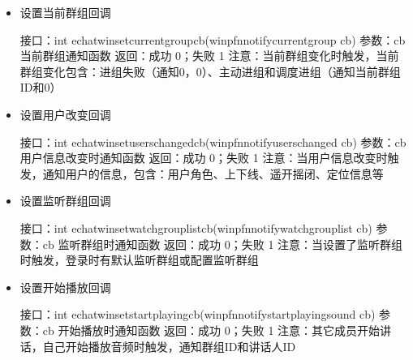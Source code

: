 \documentclass[letterpaper,10pt,english]{sphinxmanual}
\begin{document}
\begin{itemize}
%
\begin{sphinxVerbatim}[commandchars=\\\{\}]
接口：int echat\PYGZus{}win\PYGZus{}set\PYGZus{}stop\PYGZus{}speak\PYGZus{}cb(win\PYGZus{}pfn\PYGZus{}notify\PYGZus{}stop\PYGZus{}speak cb)
参数：cb 停止讲话时通知函数
返回：成功 0；失败 \PYGZhy{}1
注意：自己结束讲话时触发，结束讲话包含：主动结束（通知0，0）、被摘MIC和获取MIC失败（通知群组ID和当前用户ID）等
\end{sphinxVerbatim}

\item {} 
设置当前群组回调

%
\begin{sphinxVerbatim}[commandchars=\\\{\}]
接口：int echat\PYGZus{}win\PYGZus{}set\PYGZus{}current\PYGZus{}group\PYGZus{}cb(win\PYGZus{}pfn\PYGZus{}notify\PYGZus{}current\PYGZus{}group cb)
参数：cb 当前群组通知函数
返回：成功 0；失败 \PYGZhy{}1
注意：当前群组变化时触发，当前群组变化包含：进组失败（通知0，0）、主动进组和调度进组（通知当前群组ID和0）
\end{sphinxVerbatim}

\item {} 
设置用户改变回调

%
\begin{sphinxVerbatim}[commandchars=\\\{\}]
接口：int echat\PYGZus{}win\PYGZus{}set\PYGZus{}users\PYGZus{}changed\PYGZus{}cb(win\PYGZus{}pfn\PYGZus{}notify\PYGZus{}users\PYGZus{}changed cb)
参数：cb 用户信息改变时通知函数
返回：成功 0；失败 \PYGZhy{}1
注意：当用户信息改变时触发，通知用户的信息，包含：用户角色、上下线、遥开摇闭、定位信息等
\end{sphinxVerbatim}

\item {} 
设置监听群组回调

%
\begin{sphinxVerbatim}[commandchars=\\\{\}]
接口：int echat\PYGZus{}win\PYGZus{}set\PYGZus{}watchgrouplist\PYGZus{}cb(win\PYGZus{}pfn\PYGZus{}notify\PYGZus{}watchgrouplist cb)
参数：cb 监听群组时通知函数
返回：成功 0；失败 \PYGZhy{}1
注意：当设置了监听群组时触发，登录时有默认监听群组或配置监听群组
\end{sphinxVerbatim}

\item {} 
设置开始播放回调

%
\begin{sphinxVerbatim}[commandchars=\\\{\}]
接口：int echat\PYGZus{}win\PYGZus{}set\PYGZus{}start\PYGZus{}playing\PYGZus{}cb(win\PYGZus{}pfn\PYGZus{}notify\PYGZus{}start\PYGZus{}playing\PYGZus{}sound cb)
参数：cb 开始播放时通知函数
返回：成功 0；失败 \PYGZhy{}1
注意：其它成员开始讲话，自己开始播放音频时触发，通知群组ID和讲话人ID
\end{sphinxVerbatim}


\end{itemize}
\end{document}
